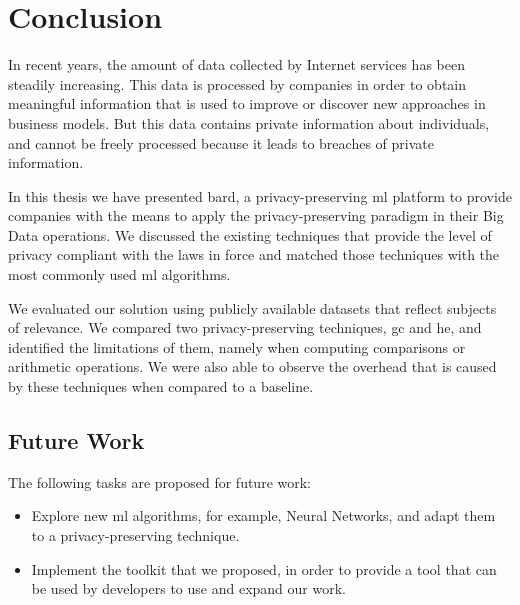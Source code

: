 %

\acresetall

\chapter{Conclusion}
\label{ch:ConclusionsAndFutureWork}


In recent years, the amount of data collected by Internet services has been steadily increasing. This data is processed by companies in order to obtain meaningful information that is used to improve or discover new approaches in business models. But this data contains private information about individuals, and cannot be freely processed because it leads to breaches of private information.

In this thesis we have presented \acs{bard}, a privacy-preserving \ac{ml} platform to provide companies with the means to apply the privacy-preserving paradigm in their Big Data operations. We discussed the existing techniques that provide the level of privacy compliant with the laws in force and matched those techniques with the most commonly used \ac{ml} algorithms.

We evaluated our solution using publicly available datasets that reflect subjects of relevance. We compared two privacy-preserving techniques, \ac{gc} and \ac{he}, and identified the limitations of them, namely when computing comparisons or arithmetic operations. We were also able to observe the overhead that is caused by these techniques when compared to a baseline.



\section{Future Work}
\label{sec:FutureWork}


The following tasks are proposed for future work:

\begin{itemize}
	\item Explore new \ac{ml} algorithms, for example, Neural Networks, and adapt them to a privacy-preserving technique.
	\item Implement the toolkit that we proposed, in order to provide a tool that can be used by developers to use and expand our work.
\end{itemize}



